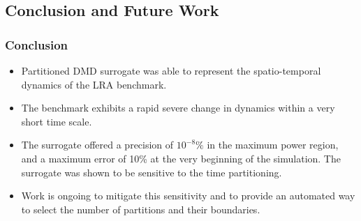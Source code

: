 \documentclass[fleqn]{beamer}
\begin{document}
  
   \begin{frame}
   \section{Conclusion and Future Work }
   \frametitle{Conclusion}
   \begin{itemize}
   \item Partitioned DMD surrogate was able to represent the spatio-temporal dynamics of the LRA benchmark.
   \item The benchmark exhibits a rapid severe change in dynamics within a very short time scale.
   \item The surrogate offered a precision of $10^{-8}\%$ in the maximum power region, and a maximum error of 10\% at the very beginning of the simulation. The surrogate was shown to be sensitive to the time partitioning. 
   \item Work is ongoing to mitigate this sensitivity and to provide an automated way to select the number of partitions and their boundaries.
   \end{itemize}
      \end{frame}
\end{document}
